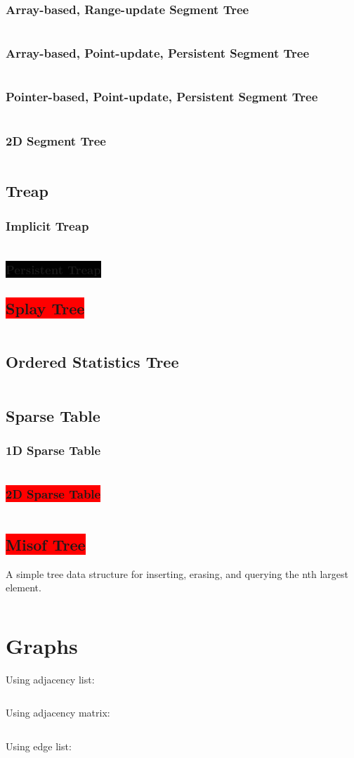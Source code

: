 \documentclass[8pt,a4paper,landscape,oneside]{amsart}
\newcommand{\code}[1]{\inputminted[fontsize=\normalsize,baselinestretch=1]{cpp}{_code/#1}}
\newcommand{\subsectionRed}[1]{\subsection{\colorbox{red}{\color{white}#1}}}
\newcommand{\subsubsectionRed}[1]{\subsubsection{\colorbox{red}{\color{white}#1}}}
\newcommand{\subsubsectionBlack}[1]{\subsubsection{\colorbox{black}{\color{white}#1}}}
\begin{document}
\begin{multicols*}{3}
    \subsubsection{Array-based, Range-update Segment Tree}
      \code{data-structures/segtree_array_lazy.cpp}
    \subsubsection{Array-based, Point-update, Persistent Segment Tree}
      \code{data-structures/segtree_persistent_iter.cpp}
    \subsubsection{Pointer-based, Point-update, Persistent Segment Tree}
      \code{data-structures/segtree_persistent_rec.cpp}
    \subsubsection{2D Segment Tree}
      \code{data-structures/segtree_2d.cpp}
  \subsection{Treap}
		\subsubsection{Implicit Treap}
			\code{data-structures/treap_implicit.cpp}
		\subsubsectionBlack{Persistent Treap}
  \subsectionRed{Splay Tree}
    \code{data-structures/splay.cpp}
	\subsection{Ordered Statistics Tree}
    \code{data-structures/ordered_statistics_tree.cpp}
  \subsection{Sparse Table}
    \subsubsection{1D Sparse Table}
      \code{data-structures/sparse.cpp}
    \subsubsectionRed{2D Sparse Table}
      \code{data-structures/sparse_2d.cpp}
  \subsectionRed{Misof Tree}
    A simple tree data structure for inserting, erasing, and querying the nth largest element.
    \code{data-structures/misof_tree.cpp}
\section{Graphs}
	Using adjacency list:
	\code{graphs/graph_template_adjlist.cpp}
	Using adjacency matrix:
	\code{graphs/graph_template_adjmat.cpp}
	Using edge list:
	\code{graphs/graph_template_edgelist.cpp}

\end{multicols*}
\end{document}
